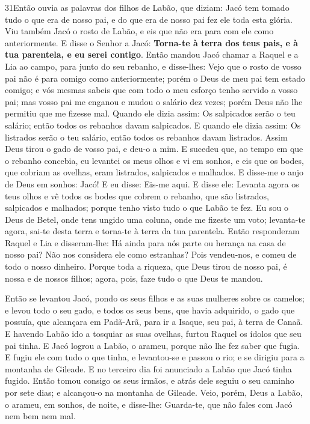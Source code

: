 \smallskip

\lettrine{31} Então ouvia as palavras dos filhos de Labão, que
diziam: Jacó tem tomado tudo o que era de nosso pai, e do que era de
nosso pai fez ele toda esta glória. Viu também Jacó o rosto de
Labão, e eis que não era para com ele como anteriormente. E
disse o Senhor a Jacó: \textbf{Torna-te à terra dos teus pais, e à
tua parentela, e eu serei contigo}. Então mandou Jacó chamar a
Raquel e a Lia ao campo, para junto do seu rebanho, e
disse-lhes: Vejo que o rosto de vosso pai não é para comigo como
anteriormente; porém o Deus de meu pai tem estado comigo; e vós
mesmas sabeis que com todo o meu esforço tenho servido a vosso pai;
mas vosso pai me enganou e mudou o salário dez vezes; porém Deus
não lhe permitiu que me fizesse mal. Quando ele dizia assim: Os
salpicados serão o teu salário; então todos os rebanhos davam
salpicados. E quando ele dizia assim: Os listrados serão o teu
salário, então todos os rebanhos davam listrados. Assim Deus
tirou o gado de vosso pai, e deu-o a mim. E sucedeu que, ao
tempo em que o rebanho concebia, eu levantei os meus olhos e vi em
sonhos, e eis que os bodes, que cobriam as ovelhas, eram listrados,
salpicados e malhados. E disse-me o anjo de Deus em sonhos:
Jacó! E eu disse: Eis-me aqui. E disse ele: Levanta agora os
teus olhos e vê todos os bodes que cobrem o rebanho, que são
listrados, salpicados e malhados; porque tenho visto tudo o que
Labão te fez. Eu sou o Deus de Betel, onde tens ungido uma
coluna, onde me fizeste um voto; levanta-te agora, sai-te desta
terra e torna-te à terra da tua parentela. Então responderam
Raquel e Lia e disseram-lhe: Há ainda para nós parte ou herança na
casa de nosso pai? Não nos considera ele como estranhas? Pois
vendeu-nos, e comeu de todo o nosso dinheiro. Porque toda a
riqueza, que Deus tirou de nosso pai, é nossa e de nossos filhos;
agora, pois, faze tudo o que Deus te mandou.

Então se levantou Jacó, pondo os seus filhos e as suas mulheres
sobre os camelos; e levou todo o seu gado, e todos os seus
bens, que havia adquirido, o gado que possuía, que alcançara em
Padã-Arã, para ir a Isaque, seu pai, à terra de Canaã. E
havendo Labão ido a tosquiar as suas ovelhas, furtou Raquel os
ídolos que seu pai tinha. E Jacó logrou a Labão, o arameu,
porque não lhe fez saber que fugia. E fugiu ele com tudo o
que tinha, e levantou-se e passou o rio; e se dirigiu para a
montanha de Gileade. E no terceiro dia foi anunciado a Labão
que Jacó tinha fugido. Então tomou consigo os seus irmãos, e
atrás dele seguiu o seu caminho por sete dias; e alcançou-o na
montanha de Gileade. Veio, porém, Deus a Labão, o arameu, em
sonhos, de noite, e disse-lhe: Guarda-te, que não fales com Jacó nem
bem nem mal.


